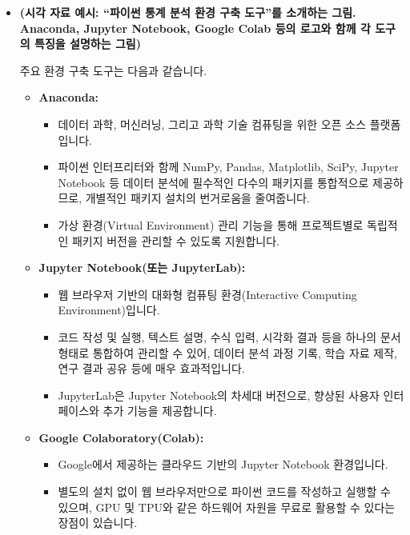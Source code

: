 \documentclass[
  letterpaper,
]{book}
\providecommand{\tightlist}{%
  \setlength{\itemsep}{0pt}\setlength{\parskip}{0pt}}
\begin{document}
\begin{itemize}
\item
  \textbf{(시각 자료 예시: ``파이썬 통계 분석 환경 구축 도구''를
  소개하는 그림. Anaconda, Jupyter Notebook, Google Colab 등의 로고와
  함께 각 도구의 특징을 설명하는 그림)}

  주요 환경 구축 도구는 다음과 같습니다.

  \begin{itemize}
  \tightlist
  \item
    \textbf{Anaconda:}

    \begin{itemize}
    \tightlist
    \item
      데이터 과학, 머신러닝, 그리고 과학 기술 컴퓨팅을 위한 오픈 소스
      플랫폼입니다.
    \item
      파이썬 인터프리터와 함께 NumPy, Pandas, Matplotlib, SciPy, Jupyter
      Notebook 등 데이터 분석에 필수적인 다수의 패키지를 통합적으로
      제공하므로, 개별적인 패키지 설치의 번거로움을 줄여줍니다.
    \item
      가상 환경(Virtual Environment) 관리 기능을 통해 프로젝트별로
      독립적인 패키지 버전을 관리할 수 있도록 지원합니다.
    \end{itemize}
  \item
    \textbf{Jupyter Notebook(또는 JupyterLab):}

    \begin{itemize}
    \tightlist
    \item
      웹 브라우저 기반의 대화형 컴퓨팅 환경(Interactive Computing
      Environment)입니다.
    \item
      코드 작성 및 실행, 텍스트 설명, 수식 입력, 시각화 결과 등을 하나의
      문서 형태로 통합하여 관리할 수 있어, 데이터 분석 과정 기록, 학습
      자료 제작, 연구 결과 공유 등에 매우 효과적입니다.
    \item
      JupyterLab은 Jupyter Notebook의 차세대 버전으로, 향상된 사용자
      인터페이스와 추가 기능을 제공합니다.
    \end{itemize}
  \item
    \textbf{Google Colaboratory(Colab):}

    \begin{itemize}
    \tightlist
    \item
      Google에서 제공하는 클라우드 기반의 Jupyter Notebook 환경입니다.
    \item
      별도의 설치 없이 웹 브라우저만으로 파이썬 코드를 작성하고 실행할
      수 있으며, GPU 및 TPU와 같은 하드웨어 자원을 무료로 활용할 수
      있다는 장점이 있습니다.
    \end{itemize}
  \end{itemize}


\end{itemize}
\end{document}
